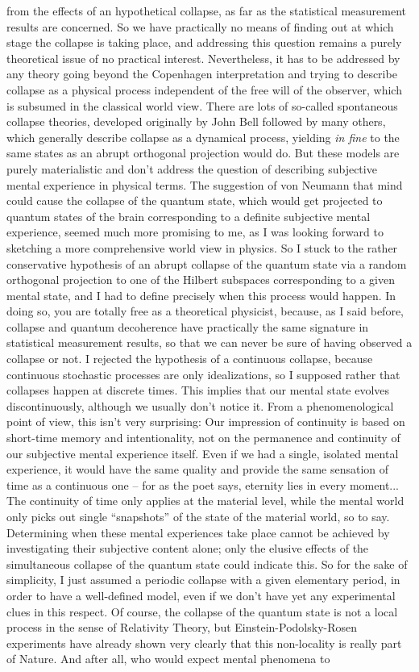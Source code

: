 from the effects of an hypothetical collapse, as far as the statistical measurement results are concerned. So we have practically no means of finding out at which stage the collapse is taking place, and addressing this question remains a purely theoretical issue of no practical interest. Nevertheless, it has to be addressed by any theory going beyond the Copenhagen interpretation and trying to describe collapse as a physical process independent of the free will of the observer, which is subsumed in the classical world view. There are lots of so-called spontaneous collapse theories, developed originally by John Bell followed by many others, which generally describe collapse as a dynamical process, yielding \textit{in fine} to the same states as an abrupt orthogonal projection would do. But these models are purely materialistic and don't address the question of describing subjective mental experience in physical terms. The suggestion of von Neumann that mind could cause the collapse of the quantum state, which would get projected to quantum states of the brain corresponding to a definite subjective mental experience, seemed much more promising to me, as I was looking forward to sketching a more comprehensive world view in physics. So I stuck to the rather conservative hypothesis of an abrupt collapse of the quantum state via a random orthogonal projection to one of the Hilbert subspaces corresponding to a given mental state, and I had to define precisely when this process would happen. In doing so, you are totally free as a theoretical physicist, because, as I said before, collapse and quantum decoherence have practically the same signature in statistical measurement results, so that we can never be sure of having observed a collapse or not. I rejected the hypothesis of a continuous collapse, because continuous stochastic processes are only idealizations, so I supposed rather that collapses happen at discrete times. This implies that our mental state evolves discontinuously, although we usually don't notice it. From a phenomenological point of view, this isn't very surprising: Our impression of continuity is based on short-time memory and intentionality, not on the permanence and continuity of our subjective mental experience itself. Even if we had a single, isolated mental experience, it would have the same quality and provide the same sensation of time as a continuous one -- for as the poet says, eternity lies in every moment... The continuity of time only applies at the material level, while the mental world only picks out single ``snapshots'' of the state of the material world, so to say. Determining when these mental experiences take place cannot be achieved by investigating their subjective content alone; only the elusive effects of the simultaneous collapse of the quantum state could indicate this. So for the sake of simplicity, I just assumed a periodic collapse with a given elementary period, in order to have a well-defined model, even if we don't have yet any experimental clues in this respect. Of course, the collapse of the quantum state is not a local process in the sense of Relativity Theory, but Einstein-Podolsky-Rosen experiments have already shown very clearly that this non-locality is really part of Nature. And after all, who would expect mental phenomena to 